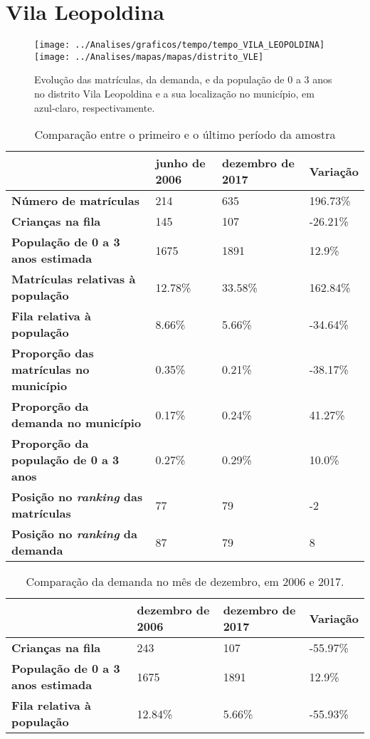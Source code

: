 \section{Vila Leopoldina}
\begin{figure}[H]
\centering
\texttt{[image: ../Analises/graficos/tempo/tempo\_VILA\_LEOPOLDINA]}
\texttt{[image: ../Analises/mapas/mapas/distrito\_VLE]}
\caption{Evolução das matrículas, da demanda, e da população de 0 a 3 anos no distrito Vila Leopoldina e a sua localização no município, em azul-claro, respectivamente.}
\end{figure}
\begin{table}[H]
\begin{tabular}{l|l|l|l}
\textbf{}                                      & \textbf{junho de 2006}       & \textbf{dezembro de 2017}    & \textbf{Variação} \\ \hline
\textbf{Número de matrículas}                  & 214 & 635 & 196.73\% \\ \hline
\textbf{Crianças na fila}                      & 145 & 107 & -26.21\% \\ \hline
\textbf{População de 0 a 3 anos estimada}      & 1675 & 1891 & 12.9\% \\ \hline
\textbf{Matrículas relativas à população}      & 12.78\% & 33.58\% & 162.84\% \\ \hline
\textbf{Fila relativa à população}             & 8.66\% & 5.66\% & -34.64\% \\ \hline
\textbf{Proporção das matrículas no município} & 0.35\% & 0.21\% & -38.17\% \\ \hline
\textbf{Proporção da demanda no município}     & 0.17\% & 0.24\% & 41.27\% \\ \hline
\textbf{Proporção da população de 0 a 3 anos}  & 0.27\% & 0.29\% & 10.0\% \\ \hline
\textbf{Posição no \textit{ranking} das matrículas}     & 77 & 79 & -2 \\ \hline
\textbf{Posição no \textit{ranking} da demanda}         & 87 & 79 & 8 \\ 
\end{tabular}
\caption{Comparação entre o primeiro e o último período da amostra}
\end{table}
\begin{table}[H]
\begin{tabular}{l|l|l|l}
\textbf{}                                 & \textbf{dezembro de 2006} & \textbf{dezembro de 2017} & \textbf{Variação} \\ \hline
\textbf{Crianças na fila}                      & 243 & 107 & -55.97\% \\ \hline
\textbf{População de 0 a 3 anos estimada}      & 1675 & 1891 & 12.9\% \\ \hline
\textbf{Fila relativa à população}             & 12.84\% & 5.66\% & -55.93\% \\
\end{tabular}
\caption{Comparação da demanda no mês de dezembro, em 2006 e 2017.}
\end{table}
